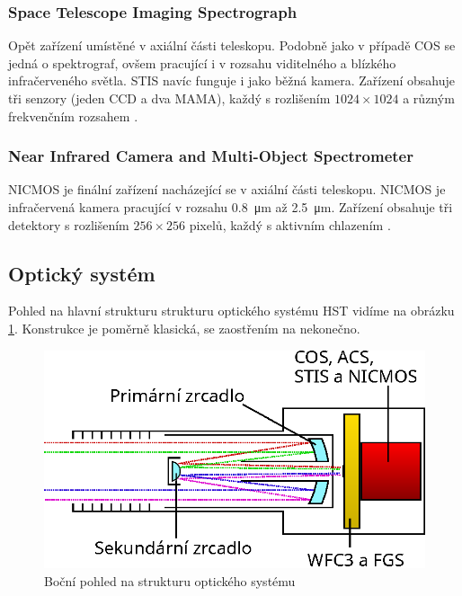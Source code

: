 \documentclass[a4paper,11pt]{article}
\begin{document}
\subsubsection{Space Telescope Imaging Spectrograph}
Opět zařízení umístěné v axiální části teleskopu. Podobně jako v případě COS se jedná o spektrograf, ovšem pracující i v rozsahu viditelného a blízkého infračerveného světla. STIS navíc funguje i jako běžná kamera. Zařízení obsahuje tři senzory (jeden CCD a dva MAMA), každý s rozlišením $1024 \times 1024$ a různým frekvenčním rozsahem \cite{stsciStisDetectors}\cite{hubblesiteStis}.

\subsubsection{Near Infrared Camera and Multi-Object Spectrometer}

NICMOS je finální zařízení nacházející se v axiální části teleskopu. NICMOS je infračervená kamera pracující v rozsahu \SI{0,8}{\um} až \SI{2,5}{\um}. Zařízení obsahuje tři detektory s rozlišením $256 \times 256$ pixelů, každý s aktivním chlazením \cite{stsciNicmosDetectors}\cite{stsciNicmosPerformance}.

\subsection{Optický systém}

Pohled na hlavní strukturu strukturu optického systému HST vidíme na obrázku \ref{hubble-structure}. Konstrukce je poměrně klasická, se zaostřením na nekonečno.

\begin{figure}[h]
	\begin{center}
		\includegraphics[width=12cm]{hubble-structure.eps}
		\caption{Boční pohled na strukturu optického systému}
		\label{hubble-structure}
	\end{center}
\end{figure}
\end{document}
